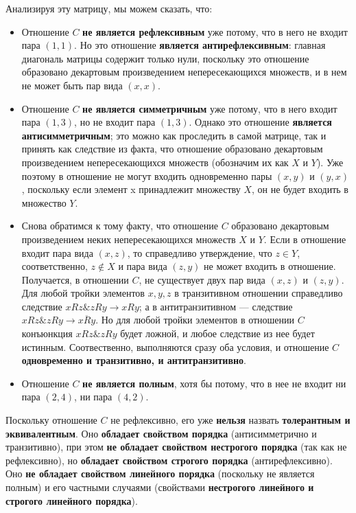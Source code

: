 \documentclass[12pt]{article}
\begin{document}
	Анализируя эту матрицу, мы можем сказать, что:
	\begin{itemize}
		\item{Отношение $C$ {\bf не является рефлексивным} уже потому, что в него не входит пара $(1, 1)$. Но это отношение {\bf является антирефлексивным}: главная диагональ матрицы содержит только нули, поскольку это отношение образовано декартовым произведением непересекающихся множеств, и в нем не может быть пар вида $(x, x)$.}
		\item{Отношение $C$ {\bf не является симметричным} уже потому, что в него входит пара $(1, 3)$, но не входит пара $(1, 3)$. Однако это отношение {\bf является антисимметричным}; это можно как проследить в самой матрице, так и принять как следствие из факта, что отношение образовано декартовым произведением непересекающихся множеств (обозначим их как $X$ и $Y$). Уже поэтому в отношение не могут входить одновременно пары $(x, y)$ и $(y, x)$, поскольку если элемент x принадлежит множеству $X$, он не будет входить в множество $Y$.}
		\item{Снова обратимся к тому факту, что отношение $C$ образовано декартовым произведением неких непересекающихся множеств $X$ и $Y$. Если в отношение входит пара вида $(x, z)$, то справедливо утверждение, что $z \in Y$, соответственно, $z \notin X$ и пара вида $(z, y)$ не может входить в отношение. Получается, в отношении $C$, не существует двух пар вида $(x, z)$ и $(z, y)$. Для любой тройки элементов $x, y, z$ в транзитивном отношении справедливо следствие $xRz \& zRy \to xRy$; а в антитранзитивном --- следствие $xRz \& zRy \to \overline{xRy}$. Но для любой тройки элементов в отношении $C$ конъюнкция $xRz \& zRy$ будет ложной, и любое следствие из нее будет истинным. Соотвественно, выполняются сразу оба условия, и отношение $C$ {\bf одновременно и транзитивно, и антитранзитивно}.}
		\item{Отношение $C$ {\bf не является полным}, хотя бы потому, что в нее не входит ни пара $(2, 4)$, ни пара $(4, 2)$.}
	\end{itemize}
	
	Поскольку отношение $C$ не рефлексивно, его уже {\bf нельзя} назвать {\bf толерантным и эквивалентным}. Оно {\bf обладает свойством порядка} (антисимметрично и транзитивно), при этом {\bf не обладает свойством нестрогого порядка} (так как не рефлексивно), но {\bf обладает свойством строгого порядка} (антирефлексивно). Оно {\bf не обладает свойством линейного порядка} (поскольку не является полным) и его частными случаями (свойствами {\bf нестрогого линейного и строгого линейного порядка}). 
	
\end{document}
